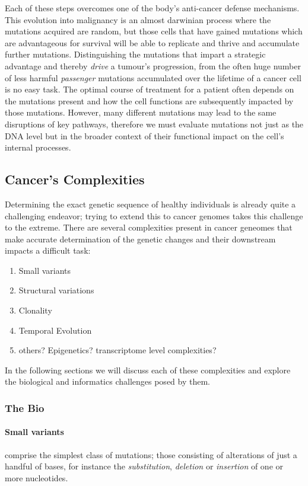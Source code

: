Each of these steps overcomes one of the body's anti-cancer defense mechanisms. This evolution into malignancy is an almost darwinian process where the mutations acquired are random, but those cells that have gained mutations which are advantageous for survival will be able to replicate and thrive and accumulate further mutations. Distinguishing the mutations that impart a strategic advantage and thereby \emph{drive} a tumour's progression, from the often huge number of less harmful \emph{passenger} mutations accumulated over the lifetime of a cancer cell is no easy task. The optimal course of treatment for a patient often depends on the mutations present and how the cell functions are subsequently impacted by those mutations. However, many different mutations may lead to the same disruptions of key pathways, therefore we must evaluate mutations not just as the DNA level but in the broader context of their functional impact on the cell's internal processes.


\subsection{Cancer's Complexities}

Determining the exact genetic sequence of healthy individuals is already quite a challenging endeavor; trying to extend this to cancer genomes takes this challenge to the extreme. There are several complexities present in cancer geneomes that make accurate determination of the genetic changes and their downstream impacts a difficult task:

\begin{enumerate}
    \itemsep-0.5em
    \item Small variants
    \item Structural variations
    \item Clonality
    \item Temporal Evolution
    \item others? Epigenetics? transcriptome level complexities?
\end{enumerate}

In the following sections we will discuss each of these complexities and explore the biological and informatics challenges posed by them.

\subsubsection{The Bio}
\paragraph{Small variants} comprise the simplest class of mutations; those consisting of alterations of just a handful of bases, for instance the \emph{substitution}, \emph{deletion} or \emph{insertion} of one or more nucleotides.

